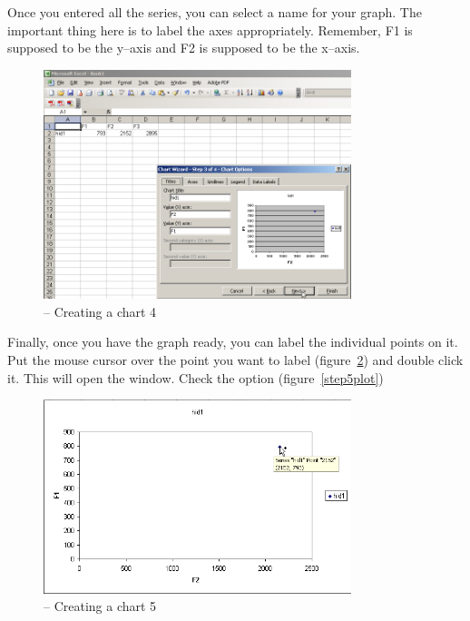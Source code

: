Once you entered all the series, you can select a name for your graph. The important thing here is to label the axes appropriately. Remember, F1 is supposed to be the y--axis and F2 is supposed to be the x--axis.

\begin{figure}[!tbp]
\caption{\MSExcel{} -- Creating a chart 4}
\label{step3plot}
	\begin{center}
		\includegraphics[width=0.8\textwidth]{./figures/ExcelPlot4}
	\end{center}
\end{figure}

Finally, once you have the graph ready, you can label the individual points on it. Put the mouse cursor over the point you want to label (figure~\ref{step4plot}) and double click it. This will open the  window. Check the option  (figure~\ref{step5plot})

\begin{figure}[!tbp]
\caption{\MSExcel{} -- Creating a chart 5}
\label{step4plot}
	\begin{center}
		\includegraphics[width=0.8\textwidth]{./figures/ExcelPlot5}
	\end{center}
\end{figure}

